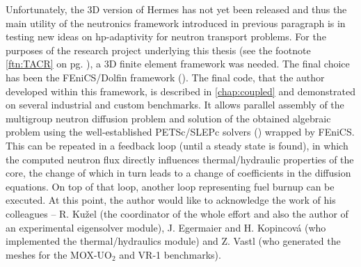 Unfortunately, the 3D version of Hermes has not yet been released and thus the main utility of the neutronics framework
introduced in previous paragraph is in testing new ideas on hp-adaptivity for neutron transport problems. For the
purposes of the research project underlying this thesis (see the footnote \ref{ftn:TACR} on pg. \pageref{ftn:TACR}), a
3D finite element framework was needed. The final choice has been the FEniCS/Dolfin framework (\cite{dolfin1, dolfin2}).
The final code, that the author developed within this framework, is described in \cref{chap:coupled} and demonstrated on
several industrial and custom benchmarks. It allows parallel assembly of the multigroup neutron diffusion problem and
solution of the obtained algebraic problem using the well-established PETSc/SLEPc solvers (\cite{petsc1, slepc1})
wrapped by FEniCS.
This can be repeated in a feedback loop (until a steady state is found), in which the computed neutron flux directly influences
thermal/hydraulic properties of the core, the change of which in turn leads to a change of coefficients in the diffusion
equations. On top of that loop, another loop representing fuel burnup can be executed. At this point, the author would
like to acknowledge the work of his colleagues -- R. Ku{\v z}el (the coordinator of the whole effort and also the author
of an experimental eigensolver module), J. Egermaier and H. Kopincov{\' a} (who implemented the thermal/hydraulics
module) and Z. Vastl (who generated the meshes for the MOX-UO$_2$ and VR-1 benchmarks).


